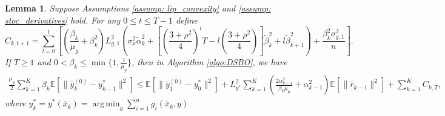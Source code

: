 \documentclass{article}
\theoremstyle{plain}
\newtheorem{lemma}[theorem]{Lemma}
\theoremstyle{definition}
\theoremstyle{remark}
\DeclareMathOperator*{\argmin}{arg\,min}
\newcommand{\E}{\mathbb{E}}
\begin{document}
\begin{lemma}\label{lem: y_error}
    Suppose Assumptions \ref{assump: lip_convexity} and \ref{assump: stoc_derivatives} hold. For any $0\leq t\leq T-1$ define
    \begin{equation}\label{eq: C_kt_const}
        C_{k,t+1} = \sum_{l=0}^{t}\left[\left(\frac{\beta_k}{\mu_g} + \beta_k^2\right)L_{g,1}^2\left(\sigma_x^2\tilde{\alpha}_k^2 + \left[\left(\frac{3+\rho^2}{4}\right)^{l}T - l\left(\frac{3+\rho^2}{4}\right)\right]\tilde{\beta}_k^2 + l\tilde{\beta}_{k+1}^2\right) + \frac{\beta_k^2\sigma_{g,1}^2}{n}\right].
    \end{equation}
    If $T\geq 1$ and $0<\beta_k\leq \min\{1, \frac{1}{\mu_g}\}$, then in Algorithm \ref{algo:DSBO}, we have
    \begin{equation}\label{ineq: bar_y_sum}
        \begin{aligned}
            \frac{\mu_g}{2}\sum_{k=1}^{K}\beta_k\E\left[\|\bar{y}_k^{(0)} - y_{k-1}^*\|^2\right]\leq \E\left[\|\bar{y}_{1}^{(0)}-y_{0}^*\|^2\right] + L_{y^*}^2\sum_{k=1}^{K}\left(\frac{2\alpha_{k-1}^2}{\beta_k\mu_g}+\alpha_{k-1}^2\right)\E\left[\|\bar{r}_{k-1}\|^2\right] + \sum_{k=1}^{K}C_{k,T},
        \end{aligned}
    \end{equation}
    where $y_k^* = y^*(\bar{x}_k) = \argmin_y \sum_{i=1}^{n}g_i(\bar{x}_k, y)$
\end{lemma}
\end{document}
